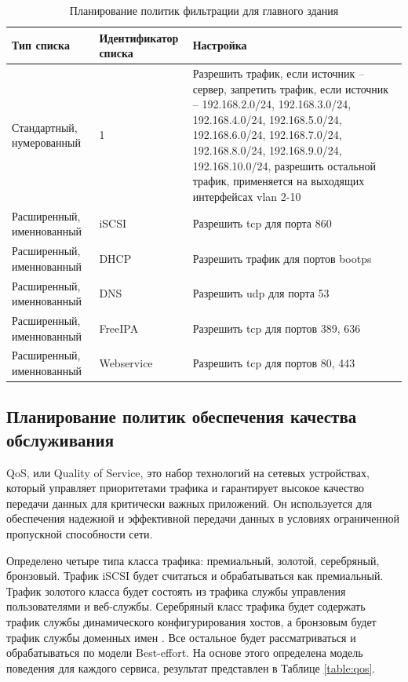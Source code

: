 \documentclass[14pt, a4paper]{extarticle}
\numberwithin{equation}{section}
\begin{document}
\begin{table}[H]
\centering
\small
\caption{Планирование политик фильтрации для главного здания}
\label{table:acl_plan}
\begin{tabular}{|p{4cm}|p{3cm}|p{8cm}|}
\hline
\textbf{Тип списка} & \textbf{Идентификатор списка} & \textbf{Настройка}\\ \hline
Стандартный, нумерованный & 1 & Разрешить трафик, если источник -- сервер,
запретить трафик, если источник -- 192.168.2.0/24, 192.168.3.0/24, 192.168.4.0/24,
192.168.5.0/24, 192.168.6.0/24, 192.168.7.0/24, 192.168.8.0/24, 192.168.9.0/24, 192.168.10.0/24,
разрешить остальной трафик, применяется на выходящих интерфейсах vlan 2-10
\\ \hline
Расширенный, именнованный & iSCSI & Разрешить tcp для порта 860 \\ \hline
Расширенный, именнованный & DHCP & Разрешить трафик для портов bootps \\ \hline
Расширенный, именнованный & DNS & Разрешить udp для порта 53\\ \hline
Расширенный, именнованный & FreeIPA & Разрешить tcp для портов 389, 636\\ \hline
Расширенный, именнованный & Webservice & Разрешить tcp для портов 80, 443\\ \hline

\end{tabular}
\end{table}




\subsection{Планирование политик обеспечения качества обслуживания}

QoS, или Quality of Service, это набор технологий на сетевых устройствах, который 
управляет приоритетами трафика и гарантирует высокое качество передачи данных для 
критически важных приложений. Он используется для обеспечения надежной и эффективной 
передачи данных в условиях ограниченной пропускной способности сети.

Определено четыре типа класса трафика: премиальный, золотой, серебряный, бронзовый. 
Трафик iSCSI будет считаться и обрабатываться как премиальный. Трафик золотого класса будет состоять 
из трафика службы управления пользователями и веб-службы. 
Серебряный класс трафика будет содержать трафик службы динамического конфигурирования хостов, а 
бронзовым будет трафик службы доменных имен \cite{qos}. Все остальное будет рассматриваться и обрабатываться по модели Best-effort.
На основе этого определена модель поведения для каждого сервиса, результат представлен в Таблице \ref{table:qos}.
\end{document}
